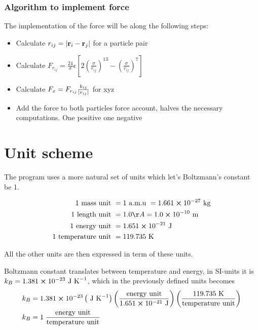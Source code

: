 \documentclass[11pt]{article}
\begin{document}
	\subsubsection{Algorithm to implement force}
		The implementation of the force will be along the following steps:
		\begin{itemize}
		\item Calculate \(r_{ij} = \abs{\vb{r}_i - \vb{r}_j}\) for a particle pair
		\item Calculate \(F_{r_{ij}} =  \frac{24}{\sigma} \epsilon \left[ 2  \left( \frac{\sigma}{r_{ij}}  \right)^{13} 
		- \left( \frac{\sigma}{r_{ij}} \right)^{7} \right]\)
		\item Calculate \(F_x = F_{r_{ij}} \frac{k_{ij}}{\abs{r_{ij}}} \) for xyz
		\item Add the force to both particles force account, halves the necessary computations. One positive one negative
		\end{itemize}
		

	\appendix
	\section{Unit scheme}
		The program uses a more natural set of units which let's Boltzmann's constant be 1.

		\begin{align}
			1 \text{ mass unit } &= 1 \text{ a.m.u } = 1.661\cross 10^{-27} \text{ kg}
			\\
			1 \text{ length unit } &= 1.0 Å = 1.0\cross 10^{-10} \text{ m}
			\\
			1 \text{ energy unit } &= 1.651 \cross 10^{-21} \text{ J}
			\\
			1 \text{ temperature unit } &= 119.735 \text{ K}
		\end{align}


	All the other units are then expressed in term of these units.

	Boltzmann constant translates between temperature and energy, in SI-units it is \( k_B = 1.381 \cross 10^{-23} \text{ J K}^{-1}\), which in the previously defined units becomes
	\begin{align}
	k_B &= 1.381 \cross 10^{-23}  \left(\text{ J K}^{-1}\right)  \left(\frac{\text{energy unit}}{1.651 \cross 10^{-21} \text{ J}}\right)
	\left( \frac{119.735 \text{ K}}{\text{temperature unit}} \right)
	\\
	k_B &= 1 \; \frac{\text{energy unit}}{\text{temperature unit}}
	\end{align}


{}

		
\end{document}
